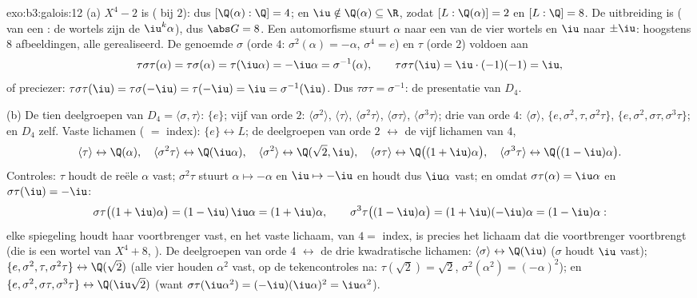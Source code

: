 \begin{solution}{exo:b3:galois:12}
(a) $X^4 - 2$ is  ( bij $2$): dus
$[\Q(\alpha):\Q] = 4$; en $\iu \notin \Q(\alpha) \subseteq \R$,
zodat $[L : \Q(\alpha)] = 2$ en $[L:\Q] = 8$. De uitbreiding is
 ( van een : de wortels
zijn de $\iu^k\alpha$), dus $\abs G = 8$. Een automorfisme stuurt
$\alpha$ naar een van de vier wortels en $\iu$ naar $\pm\iu$:
hoogstens $8$ afbeeldingen, alle gerealiseerd. De genoemde
$\sigma$ (orde $4$: $\sigma^2(\alpha) = -\alpha$, $\sigma^4 = e$)
en $\tau$ (orde $2$) voldoen aan
\[
\tau\sigma\tau(\alpha) = \tau\sigma(\alpha) =
\tau(\iu\alpha) = -\iu\alpha = \sigma^{-1}(\alpha),
\qquad \tau\sigma\tau(\iu) = \iu\cdot(-1)(-1) = \iu ,
\]
of preciezer: $\tau\sigma\tau(\iu) = \tau\sigma(-\iu) = \tau(-\iu)
= \iu = \sigma^{-1}(\iu)$. Dus $\tau\sigma\tau = \sigma^{-1}$: de
presentatie van $D_4$.

(b) De tien deelgroepen van $D_4 = \langle\sigma, \tau\rangle$:
$\{e\}$; vijf van orde $2$: $\langle\sigma^2\rangle$,
$\langle\tau\rangle$, $\langle\sigma^2\tau\rangle$,
$\langle\sigma\tau\rangle$, $\langle\sigma^3\tau\rangle$; drie van
orde $4$: $\langle\sigma\rangle$, $\{e, \sigma^2, \tau,
\sigma^2\tau\}$, $\{e, \sigma^2, \sigma\tau, \sigma^3\tau\}$; en
$D_4$ zelf. Vaste lichamen ( $=$ index): $\{e\}
\leftrightarrow L$; de deelgroepen van orde $2$ $\leftrightarrow$
de vijf lichamen van  $4$,
\[
\langle\tau\rangle \leftrightarrow \Q(\alpha),\quad
\langle\sigma^2\tau\rangle \leftrightarrow \Q(\iu\alpha),
\quad
\langle\sigma^2\rangle \leftrightarrow \Q(\sqrt2, \iu),\quad
\langle\sigma\tau\rangle \leftrightarrow
\Q\bigl((1+\iu)\alpha\bigr),\quad
\langle\sigma^3\tau\rangle \leftrightarrow
\Q\bigl((1-\iu)\alpha\bigr) .
\]
Controles: $\tau$ houdt de reële $\alpha$ vast; $\sigma^2\tau$
stuurt $\alpha \mapsto -\alpha$ en $\iu \mapsto -\iu$ en houdt dus
$\iu\alpha$ vast; en omdat $\sigma\tau(\alpha) = \iu\alpha$ en
$\sigma\tau(\iu) = -\iu$:
\[
\sigma\tau\bigl((1+\iu)\alpha\bigr) =
(1 - \iu)\,\iu\alpha = (1 + \iu)\alpha,
\qquad
\sigma^3\tau\bigl((1-\iu)\alpha\bigr) =
(1 + \iu)(-\iu)\alpha = (1 - \iu)\alpha :
\]
elke spiegeling houdt haar voortbrenger vast, en het vaste
lichaam, van  $4 = $ index, is precies het lichaam dat die
voortbrenger voortbrengt (die is een wortel van $X^4 + 8$,
). De deelgroepen van orde $4$ $\leftrightarrow$ de
drie kwadratische lichamen: $\langle\sigma\rangle
\leftrightarrow \Q(\iu)$ ($\sigma$ houdt $\iu$ vast); $\{e,
\sigma^2, \tau, \sigma^2\tau\} \leftrightarrow \Q(\sqrt2)$ (alle
vier houden $\alpha^2$ vast, op de tekencontroles na:
$\tau(\sqrt2) = \sqrt2$, $\sigma^2(\alpha^2) = (-\alpha)^2$); en
$\{e, \sigma^2, \sigma\tau, \sigma^3\tau\} \leftrightarrow
\Q(\iu\sqrt2)$ (want $\sigma\tau(\iu\alpha^2) = (-\iu)(\iu\alpha)^2
= \iu\alpha^2$).


\end{solution}
